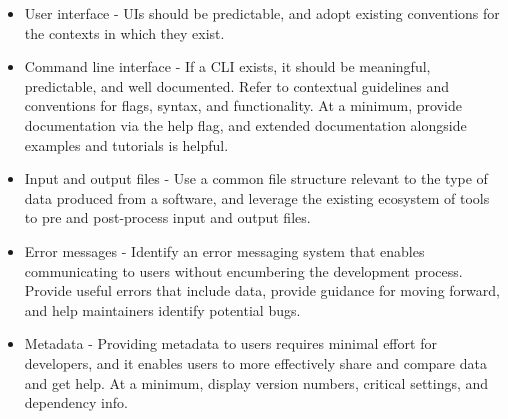 \documentclass[]{nrel}
\begin{document}
\begin{itemize}
\item User interface - UIs should be predictable, and adopt existing conventions for the contexts
in which they exist.

\item Command line interface - If a CLI exists, it should be meaningful, predictable, and well documented.
Refer to contextual guidelines and conventions for flags, syntax, and functionality.
At a minimum, provide documentation via the help flag, and extended documentation alongside
examples and tutorials is helpful.

\item Input and output files - Use a common file structure relevant to the type of data produced from a software,
and leverage the existing ecosystem of tools to pre and post-process input and output files.

\item Error messages - Identify an error messaging system that enables communicating to users without encumbering
the development process.
Provide useful errors that include data, provide guidance for moving forward, and help maintainers
identify potential bugs.

\item Metadata - Providing metadata to users requires minimal effort for developers, and it enables users to more
effectively share and compare data and get help. At a minimum, display version numbers, critical
settings, and dependency info.
\end{itemize}
\end{document}
